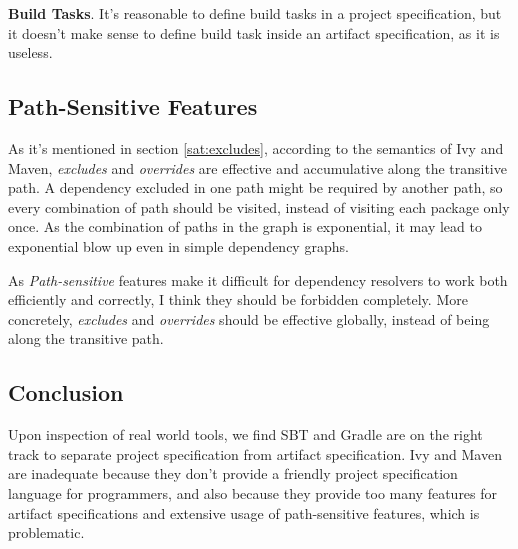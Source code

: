 \textbf{Build Tasks}. It's reasonable to define build tasks in a project specification, but it doesn't make sense to define build task inside an artifact specification, as it is useless.

\subsection{Path-Sensitive Features}

\label{pragmatics:path-sensitive}

As it's mentioned in section \ref{sat:excludes}, according to the semantics of Ivy and Maven, \emph{excludes} and \emph{overrides} are effective and accumulative along the transitive path. A dependency excluded in one path might be required by another path, so every combination of path should be visited, instead of visiting each package only once. As the combination of paths in the graph is exponential, it may lead to exponential blow up even in simple dependency graphs.

As \emph{Path-sensitive} features make it difficult for dependency resolvers to work both efficiently and correctly, I think they should be forbidden completely. More concretely, \emph{excludes} and \emph{overrides} should be effective globally, instead of being along the transitive path.

\subsection{Conclusion}

Upon inspection of real world tools, we find SBT and Gradle are on the right track to separate project specification from artifact specification. Ivy and Maven are inadequate because they don't provide a friendly project specification language for programmers, and also because they provide too many features for artifact specifications and extensive usage of path-sensitive features, which is problematic.
